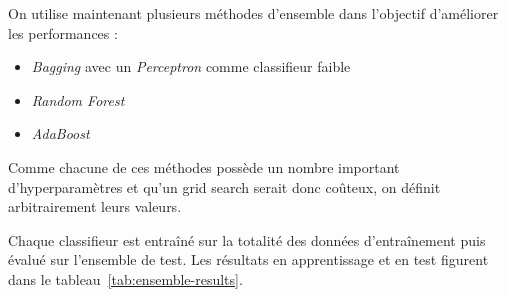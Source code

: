 \documentclass[12pt]{article}
\newcommand{\tabref}[1]{tableau~\ref{#1}}
\begin{document}
On utilise maintenant plusieurs méthodes d'ensemble dans l'objectif d'améliorer
les performances :

\begin{itemize}
    \item \emph{Bagging} avec un \emph{Perceptron} comme classifieur faible
    \item \emph{Random Forest}
    \item \emph{AdaBoost}
\end{itemize}

Comme chacune de ces méthodes possède un nombre important d'hyperparamètres et
qu'un grid search serait donc coûteux, on définit arbitrairement leurs valeurs.

Chaque classifieur est entraîné sur la totalité des données d'entraînement puis
évalué sur l'ensemble de test. Les résultats en apprentissage et en test
figurent dans le \tabref{tab:ensemble-results}.


\begin{table}[H]
    \caption{Performances obtenues par chaque méthode}
    \label{tab:ensemble-results}
\end{table}

\end{document}
